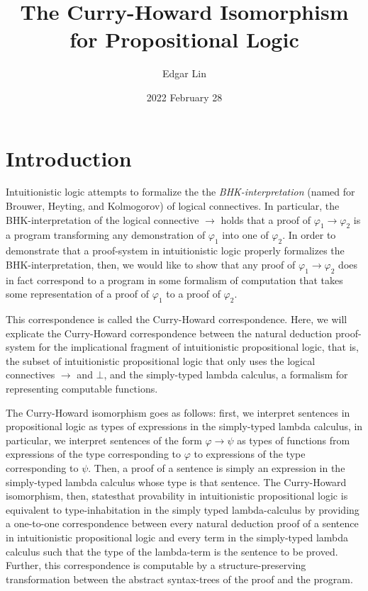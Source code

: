 \documentclass[12pt]{article}
\title{The Curry-Howard Isomorphism for Propositional Logic}
\date{2022 February 28}
\author{Edgar Lin}
\begin{document}
\maketitle
\section{Introduction}
Intuitionistic logic attempts to formalize the the \textit{BHK-interpretation} (named for Brouwer, Heyting, and Kolmogorov) of logical connectives. 
In particular, the BHK-interpretation of the logical connective $\to$ holds that a proof of $\varphi_1\to\varphi_2$ is a program transforming any demonstration of $\varphi_1$ into one of $\varphi_2$. 
In order to demonstrate that a proof-system in intuitionistic logic properly formalizes the BHK-interpretation, then, we would like to show that any proof of $\varphi_1\to\varphi_2$ does in fact correspond to a program in some formalism of computation that takes some representation of a proof of $\varphi_1$ to a proof of $\varphi_2$.  

This correspondence is called the Curry-Howard correspondence. Here, we will explicate the Curry-Howard correspondence between the natural deduction proof-system for the implicational fragment of intuitionistic propositional logic, that is, the subset of intuitionistic propositional logic that only uses the logical connectives $\to$ and $\bot$, and the simply-typed lambda calculus, a formalism for representing computable functions. 

The Curry-Howard isomorphism goes as follows: first, we interpret sentences in propositional logic as types of expressions in the simply-typed lambda calculus, in particular, we interpret sentences of the form $\varphi\to\psi$ as types of functions from expressions of the type corresponding to $\varphi$ to expressions of the type corresponding to $\psi$. 
Then, a proof of a sentence is simply an expression in the simply-typed lambda calculus whose type is that sentence. The Curry-Howard isomorphism, then, statesthat provability in intuitionistic propositional logic is equivalent to type-inhabitation in the simply typed lambda-calculus by providing a one-to-one correspondence between every natural deduction proof of a sentence in intuitionistic propositional logic and every term in the simply-typed lambda calculus such that the type of the lambda-term is the sentence to be proved. Further, this correspondence is computable by a structure-preserving transformation between the abstract syntax-trees of the proof and the program.  
\end{document}
